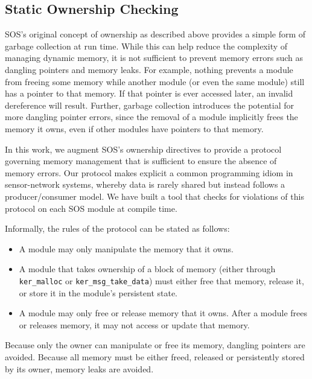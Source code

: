
\subsection{Static Ownership Checking}

SOS's original concept of ownership as described above
provides a simple form of
garbage collection at run time.
While this can help
reduce the complexity of managing
dynamic memory, it is not sufficient to
prevent memory errors such as dangling pointers and memory leaks.
For example, nothing prevents a module from freeing some memory while
another module (or even the same module) still has a pointer to that
memory.  If that pointer is ever accessed later, an invalid dereference
will result.  Further, garbage collection introduces the potential for
more dangling pointer errors, since the removal of a module implicitly
frees the memory it owns, even if other modules have pointers to that
memory.


In this work, we augment SOS's ownership directives to
provide a protocol governing
memory management that is sufficient to ensure the absence of
memory errors.
Our protocol makes explicit a common programming idiom in
sensor-network systems, whereby data is rarely shared but instead
follows a producer/consumer model.
We have built a tool that checks for violations of this protocol on
each SOS module at compile time.

Informally, the rules of the protocol can be stated as
follows:
\begin{itemize}

\item A module may only manipulate the memory that it owns.

\item A module that takes ownership of a block of memory (either
  through {\tt ker\_malloc} or {\tt ker\_msg\_take\_data}) must either
  free that memory, release it, or store it in the module's
  persistent state.

\item A module may only free or release memory that it owns.  After a module
  frees or releases memory, it may not access or update that memory.
\end{itemize}
Because only the owner can manipulate or free its
memory, dangling pointers are avoided.  Because all memory must be
either freed, released or persistently stored by its owner,
memory leaks are avoided.


